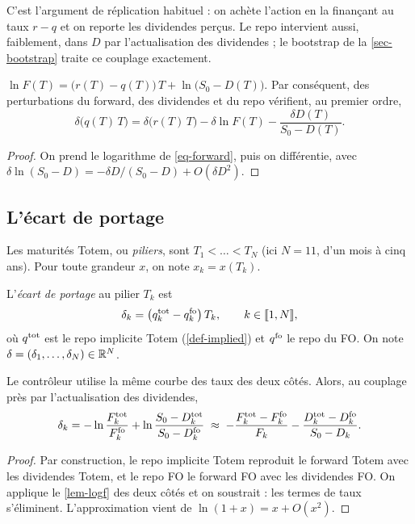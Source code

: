 C'est l'argument de réplication habituel : on achète l'action en la finançant au taux $r-q$ et on reporte les
dividendes perçus. Le repo intervient aussi, faiblement, dans $D$ par l'actualisation des dividendes ; le bootstrap de
la \cref{sec-bootstrap} traite ce couplage exactement.

\begin{lemma}\label{lem-logf}
$\ln F(T)=\bigl(r(T)-q(T)\bigr)\,T+\ln\bigl(S_0-D(T)\bigr)$. Par conséquent, des perturbations du forward, des
dividendes et du repo vérifient, au premier ordre,
\begin{equation}\label{eq-additivity}
\delta\bigl(q(T)\,T\bigr)=\delta\bigl(r(T)\,T\bigr)-\delta\ln F(T)-\frac{\delta D(T)}{S_0-D(T)} .
\end{equation}
\end{lemma}
\begin{proof}
On prend le logarithme de \eqref{eq-forward}, puis on différentie, avec $\delta\ln(S_0-D)=-\delta D/(S_0-D)+O(\delta D^2)$.
\end{proof}

\subsection{L'écart de portage}
Les maturités Totem, ou \emph{piliers}, sont $T_1<\dots<T_N$ (ici $N=11$, d'un mois à cinq ans). Pour toute grandeur
$x$, on note $x_k=x(T_k)$.

\begin{definition}\label{def-delta}
L'\emph{écart de portage} au pilier $T_k$ est
\begin{equation}\label{eq-delta}
\delta_k=\bigl(q^{\mathrm{tot}}_k-q^{\mathrm{fo}}_k\bigr)\,T_k, \qquad k\in\llbracket 1, N\rrbracket,
\end{equation}
où $q^{\mathrm{tot}}$ est le repo implicite Totem (\cref{def-implied}) et $q^{\mathrm{fo}}$ le repo du FO. On note
$\delta=(\delta_1, \dots, \delta_N)\in\mathbb{R}^N$.
\end{definition}

\begin{proposition}\label{prop-delta}
Le contrôleur utilise la même courbe des taux des deux côtés. Alors, au couplage près par l'actualisation des
dividendes,
\begin{equation}\label{eq-delta-exact}
\delta_k=-\ln\frac{F^{\mathrm{tot}}_k}{F^{\mathrm{fo}}_k}+\ln\frac{S_0-D^{\mathrm{tot}}_k}{S_0-D^{\mathrm{fo}}_k}
\;\approx\;-\frac{F^{\mathrm{tot}}_k-F^{\mathrm{fo}}_k}{F_k}-\frac{D^{\mathrm{tot}}_k-D^{\mathrm{fo}}_k}{S_0-D_k} .
\end{equation}
\end{proposition}
\begin{proof}
Par construction, le repo implicite Totem reproduit le forward Totem avec les dividendes Totem, et le repo FO le
forward FO avec les dividendes FO. On applique le \cref{lem-logf} des deux côtés et on soustrait : les termes de taux
s'éliminent. L'approximation vient de $\ln(1+x)=x+O(x^2)$.
\end{proof}

